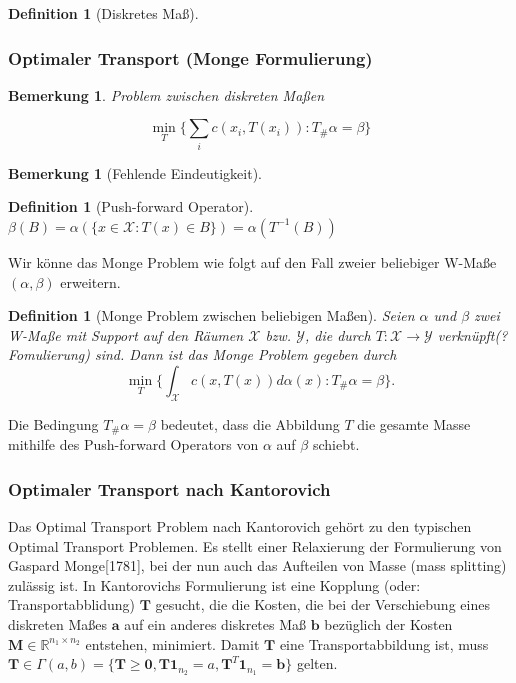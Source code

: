 \documentclass[twoside, 11pt,a4paper]{article}
\newtheorem{definition}[theorem]{Definition}
\newtheorem{remark}[theorem]{Bemerkung}
\numberwithin{equation}{section}
\begin{document}
	\begin{definition}[Diskretes Maß]
		
	\end{definition}
	\subsubsection{Optimaler Transport (Monge Formulierung)}
	\begin{remark}
		Problem zwischen diskreten Maßen
		
		\begin{equation}
		\min_T \lbrace \sum_i {c(x_i, T(x_i))} : T_\#\alpha = \beta \rbrace
		\end{equation}
	\end{remark}
	\begin{remark}[Fehlende Eindeutigkeit]
		
	\end{remark}
	
	\begin{definition}[Push-forward Operator]
		$\beta (B) = \alpha (\lbrace x \in \mathcal{X}: T(x) \in B \rbrace) = \alpha(T^{-1}(B))$ \label{eq_pushforward}
		
	\end{definition}
	Wir könne das Monge Problem wie folgt auf den Fall zweier beliebiger W-Maße $(\alpha, \beta )$ erweitern.
	
	\begin{definition}[Monge Problem zwischen beliebigen Maßen]
		Seien $\alpha$ und $ \beta$ zwei W-Maße mit Support auf den Räumen $\mathcal{X}$ bzw. $\mathcal{Y}$, die durch $T:\mathcal{X} \to 	\mathcal{Y}$ verknüpft(? Fomulierung) sind.
		Dann ist das Monge Problem gegeben durch
		\begin{equation}
		\min_T \lbrace \int_\mathcal{X}{c(x,T(x)) d\alpha (x)} : T_\#\alpha = \beta \rbrace.
		\end{equation}
	\end{definition}
	Die Bedingung $T_\#\alpha = \beta$ bedeutet, dass die Abbildung $T$ die gesamte Masse mithilfe des Push-forward Operators von $\alpha$ auf $\beta$ schiebt.
	\subsubsection{Optimaler Transport nach Kantorovich}
	Das Optimal Transport Problem nach Kantorovich gehört zu den typischen Optimal Transport Problemen. Es stellt einer Relaxierung der Formulierung von Gaspard Monge[1781], bei der nun auch das Aufteilen von Masse (mass splitting) zulässig ist.
	In Kantorovichs Formulierung ist eine Kopplung (oder: Transportabblidung) $\boldsymbol{T}$ gesucht, die die Kosten, die bei der Verschiebung eines diskreten Maßes $\boldsymbol{a}$ auf ein anderes diskretes Maß $\boldsymbol{b}$ bezüglich der Kosten $\boldsymbol{M} \in \mathbb{R}^{n_1 \times n_2}$ entstehen, minimiert.
	Damit $\boldsymbol{T}$ eine Transportabbildung ist, muss $\boldsymbol{T} \in \Gamma(a,b) = \lbrace \boldsymbol{T} \geq \boldsymbol{0}, \boldsymbol{T}\boldsymbol{1}_{n_2} = a, \boldsymbol{T}^{T}\boldsymbol{1}_{n_1} = \boldsymbol{b} \rbrace$ gelten.
	
\end{document}
